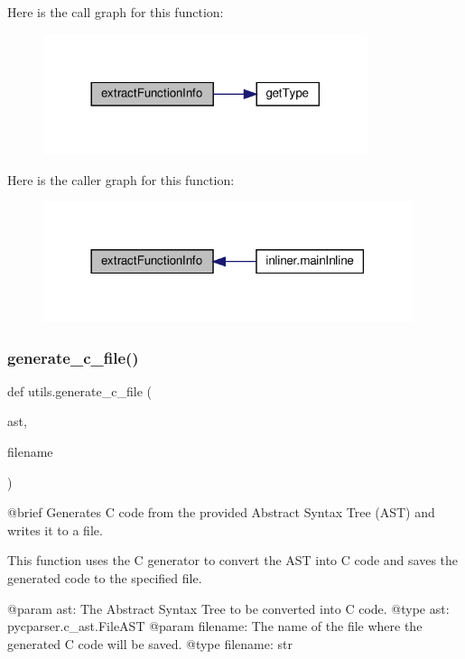 Here is the call graph for this function\+:\nopagebreak
\begin{figure}[H]
\begin{center}
\leavevmode
\includegraphics[width=269pt]{namespaceutils_a01c8b36149daaab35946bf42cf90fcc1_cgraph}
\end{center}
\end{figure}
Here is the caller graph for this function\+:\nopagebreak
\begin{figure}[H]
\begin{center}
\leavevmode
\includegraphics[width=306pt]{namespaceutils_a01c8b36149daaab35946bf42cf90fcc1_icgraph}
\end{center}
\end{figure}
\mbox{\label{namespaceutils_a5ab527c9affdfd39949f2e88c4299989}} 
\subsubsection{\texorpdfstring{generate\+\_\+c\+\_\+file()}{generate\_c\_file()}}
{\footnotesize\ttfamily def utils.\+generate\+\_\+c\+\_\+file (\begin{DoxyParamCaption}\item[{}]{ast,  }\item[{}]{filename }\end{DoxyParamCaption})}

\begin{DoxyVerb}@brief Generates C code from the provided Abstract Syntax Tree (AST) and writes it to a file.

This function uses the C generator to convert the AST into C code and saves the generated code to the specified file.

@param ast: The Abstract Syntax Tree to be converted into C code.
@type ast: pycparser.c_ast.FileAST
@param filename: The name of the file where the generated C code will be saved.
@type filename: str
\end{DoxyVerb}
 

